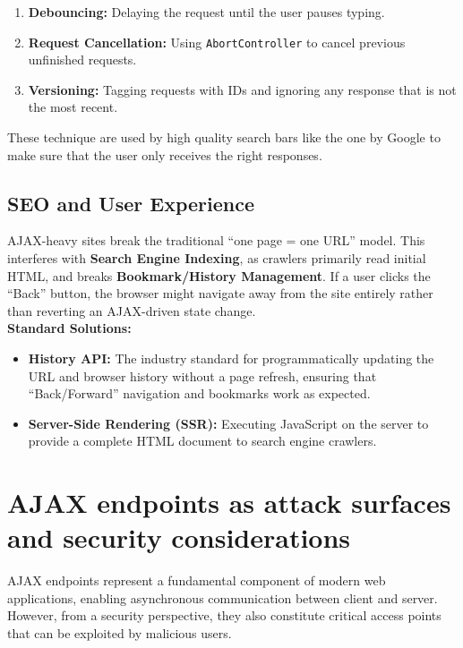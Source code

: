 \documentclass{scrbook}
\begin{document}
	\begin{enumerate}
		\item \textbf{Debouncing:} Delaying the request until the user pauses typing.
		\item \textbf{Request Cancellation:} Using \texttt{AbortController} to cancel previous unfinished requests.
		\item \textbf{Versioning:} Tagging requests with IDs and ignoring any response that is not the most recent.
	\end{enumerate}
	
	These technique are used by high quality search bars like the one by Google to make sure that the user only receives the right responses.
	
	\newpage
	\subsection{SEO and User Experience}
	
	AJAX-heavy sites break the traditional ``one page = one URL'' model. This interferes with \textbf{Search Engine Indexing}, as crawlers primarily read initial HTML, and breaks \textbf{Bookmark/History Management}. If a user clicks the ``Back'' button, the browser might navigate away from the site entirely rather than reverting an AJAX-driven state change.\\
	
	\textbf{Standard Solutions:}
	
	\begin{itemize}
		\item \textbf{History API:} The industry standard for programmatically updating the URL and browser history without a page refresh, ensuring that ``Back/Forward'' navigation and bookmarks work as expected.
		
		\item \textbf{Server-Side Rendering (SSR):} Executing JavaScript on the server to provide a complete HTML document to search engine crawlers.
	\end{itemize}
	
	\section{AJAX endpoints as attack surfaces and security considerations}
	
	AJAX endpoints represent a fundamental component of modern web applications, enabling asynchronous communication between client and server. However, from a security perspective, they also constitute critical access points that can be exploited by malicious users.
	
\end{document}
